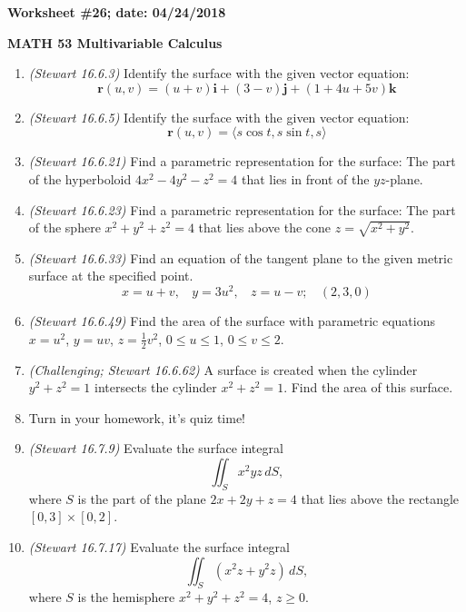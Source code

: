 \documentclass{article}
\newcommand{\ii}{\mathbf{i}}
\newcommand{\jj}{\mathbf{j}}
\newcommand{\kk}{\mathbf{k}}
\newcommand{\rr}{\mathbf{r}}
\begin{document}
{\bf Worksheet \#26; date: 04/24/2018}

{\bf MATH 53 Multivariable Calculus}

\begin{enumerate}
\item {\em (Stewart 16.6.3)} Identify the surface with the given vector equation:
\[
\rr(u, v) = (u+v) \ii + (3-v) \jj + (1 + 4u + 5v) \kk
\]

\item {\em (Stewart 16.6.5)} Identify the surface with the given vector equation:
\[
\rr(u, v) = \langle s \cos t, s \sin t, s \rangle
\]

\item {\em (Stewart 16.6.21)} Find a parametric representation for the surface: The part of the hyperboloid $4x^2 - 4y^2 - z^2 = 4$ that lies in front of the $yz$-plane.

\item {\em (Stewart 16.6.23)} Find a parametric representation for the surface: The part of the sphere $x^2 + y^2 + z^2 = 4$ that lies above the cone $z = \sqrt{x^2 + y^2}$.

\item {\em (Stewart 16.6.33)} Find an equation of the tangent plane to the given metric surface at the specified point.
\[
x = u + v, ~~~~ y = 3u^2, ~~~~ z = u - v; ~~~~ (2, 3, 0)
\]

\item {\em (Stewart 16.6.49)} Find the area of the surface with parametric equations $x = u^2$, $y = uv$, $z = \frac{1}{2} v^2$, $0 \le u \le 1$, $0 \le v \le 2$.

\item {\em (Challenging; Stewart 16.6.62)} A surface is created when the cylinder $y^2 + z^2 = 1$ intersects the cylinder $x^2 + z^2 = 1$. Find the area of this surface.

\item Turn in your homework, it's quiz time!

\item {\em (Stewart 16.7.9)} Evaluate the surface integral
\[
\iint_S x^2 yz \,dS,
\]
where $S$ is the part of the plane $2x + 2y + z = 4$ that lies above the rectangle $[0, 3] \times [0, 2]$.

\item {\em (Stewart 16.7.17)} Evaluate the surface integral
\[
\iint_S (x^2 z + y^2 z) \,dS,
\]
where $S$ is the hemisphere $x^2 + y^2 + z^2 = 4$, $z \ge 0$.
\end{enumerate}
\end{document}
